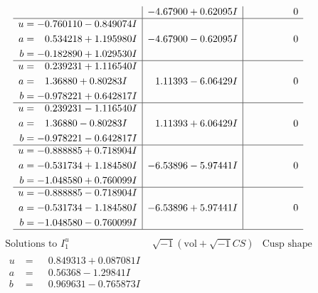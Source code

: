\documentclass[1p]{elsarticle_modified}
\theoremstyle{definition}
\newcommand{\I}{\sqrt{-1}}
\begin{document}
$$\begin{array}{c|c|c}
 & -4.67900 + 0.62095 I & \phantom{-0.000000 } 0 \\ \hline\begin{aligned}
u &= -0.760110 - 0.849074 I \\
a &= \phantom{-}0.534218 + 1.195980 I \\
b &= -0.182890 + 1.029530 I\end{aligned}
 & -4.67900 - 0.62095 I & \phantom{-0.000000 } 0 \\ \hline\begin{aligned}
u &= \phantom{-}0.239231 + 1.116540 I \\
a &= \phantom{-}1.36880 + 0.80283 I \\
b &= -0.978221 + 0.642817 I\end{aligned}
 & \phantom{-}1.11393 - 6.06429 I & \phantom{-0.000000 } 0 \\ \hline\begin{aligned}
u &= \phantom{-}0.239231 - 1.116540 I \\
a &= \phantom{-}1.36880 - 0.80283 I \\
b &= -0.978221 - 0.642817 I\end{aligned}
 & \phantom{-}1.11393 + 6.06429 I & \phantom{-0.000000 } 0 \\ \hline\begin{aligned}
u &= -0.888885 + 0.718904 I \\
a &= -0.531734 + 1.184580 I \\
b &= -1.048580 + 0.760099 I\end{aligned}
 & -6.53896 - 5.97441 I & \phantom{-0.000000 } 0 \\ \hline\begin{aligned}
u &= -0.888885 - 0.718904 I \\
a &= -0.531734 - 1.184580 I \\
b &= -1.048580 - 0.760099 I\end{aligned}
 & -6.53896 + 5.97441 I & \phantom{-0.000000 } 0\\
 \hline 
 \end{array}$$\newpage$$\begin{array}{c|c|c}  
\text{Solutions to }I^u_{1}& \I (\text{vol} + \sqrt{-1}CS) & \text{Cusp shape}\\
 \hline 
\begin{aligned}
u &= \phantom{-}0.849313 + 0.087081 I \\
a &= \phantom{-}0.56368 - 1.29841 I \\
b &= \phantom{-}0.969631 - 0.765873 I\end{aligned}

\end{array}$$
\end{document}
